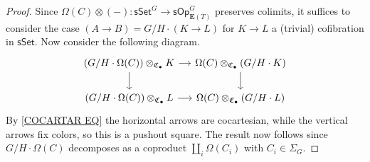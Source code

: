 \documentclass[a4paper,10pt]{article}%
\numberwithin{equation}{section}
\numberwithin{figure}{section}
\newtheorem{lemma}[equation]{Lemma}%
\theoremstyle{definition} %
\newcommand{\sSet}{\ensuremath{\mathsf{sSet}}}%
\newcommand{\sOp}{\ensuremath{\mathsf{sOp}}}%
\newcommand{\1}{\ensuremath{\mathbbm 1}}%
\begin{document}
\begin{proof}
	Since $\Omega(C) \otimes (-) \colon \sSet^G \to \sOp^G_{\boldsymbol{E}(T)}$ preserves colimits, 
	it suffices to consider the case 
	$(A \to B) = G/H \cdot (K \to L)$ for $K \to L$ a (trivial) cofibration in $\sSet$.
	Now consider the following diagram.
\begin{equation}
\begin{tikzcd}[column sep = small, ampersand replacement = \&]
	\left(G/H \cdot \Omega(C)\right) \otimes_{\mathfrak{C}_{\bullet}} K 
	\arrow[r] \arrow[d]
\&
	\Omega(C) \otimes_{\mathfrak{C}_{\bullet}} \left(G/H \cdot K\right)
	\arrow[d]
\\
	\left(G/H \cdot \Omega(C)\right) \otimes_{\mathfrak{C}_{\bullet}} L
	\arrow[r] 
\&
	\Omega(C) \otimes_{\mathfrak{C}_{\bullet}} \left(G/H \cdot L\right)
\end{tikzcd}
\end{equation}
By \eqref{COCARTAR EQ} the horizontal arrows are cocartesian, while the vertical arrows fix colors, 
so this is a pushout square.
The result now follows since 
$G/H \cdot \Omega(C)$ decomposes as a coproduct 
$\amalg_i \Omega(C_i)$ with $C_i\in \Sigma_G$.
\end{proof}



%
\end{document}
